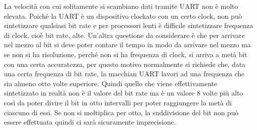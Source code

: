 \documentclass[12pt, a4paper]{report}
\begin{document}
La velocità con cui solitamente si scambiano dati tramite UART non è molto elevata. Poiché la UART è un dispositivo clockato con un certo clock, non può sintetizzare qualsiasi bit rate e per processori lenti è difficile sintetizzare frequenza di clock, cioè bit rate, alte. Un'altra questione da considerare è che per arrivare nel mezzo al bit si deve poter contare il tempo in modo da arrivare nel mezzo ma se non si ha risoluzione, perché non si ha frequenza di clock, si arriva a metà bit con una certa accuratezza, per questo motivo normalmente si richiede che, data una certa frequenza di bit rate, la macchian UART lavori ad una frequenza che sia almeno otto volte superiore. Quindi quello che viene effettivamente sintetizzato in realtà non è il valore del bit rate ma è un valore 8 volte più alto così da poter divire il bit in otto intervalli per poter raggiungere la metà di ciascuno di essi. Se non si moltiplica per otto, la suddivisione del bit non può essere effettuata quindi ci sarà sicuramente imprecisione.
\end{document}
